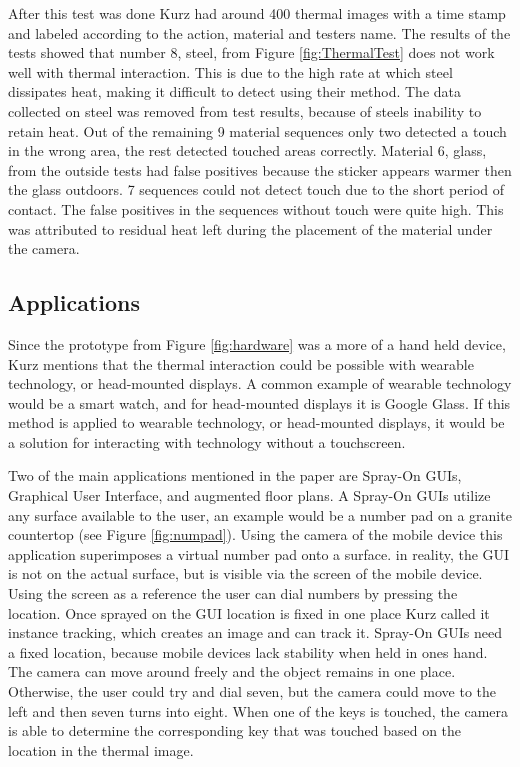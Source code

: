 \documentclass{sig-alternate}
\begin{document}
After this test was done Kurz had around 400 thermal images with a time stamp and labeled according to the action, material and testers name. The results of the tests showed that number 8, steel, from Figure \ref{fig:ThermalTest} does not work well with thermal interaction. This is due to the high rate at which steel dissipates heat, making it difficult to detect using their method. The data collected on steel was removed from test results, because of steels inability to retain heat. Out of the remaining 9 material sequences only two detected a touch in the wrong area, the rest detected touched areas correctly. Material 6, glass, from the outside tests had false positives because the sticker appears warmer then the glass outdoors. 7 sequences could not detect touch due to the short period of contact. The false positives in the sequences without touch were quite high. This was attributed to residual heat left during the placement of the material under the camera.

\subsection{Applications}
\label{Thermal Applications}
Since the prototype from Figure \ref{fig:hardware} was a more of a hand held device, Kurz mentions that the thermal interaction could be possible with wearable technology, or head-mounted displays. A common example of wearable technology would be a smart watch, and for head-mounted displays it is Google Glass. If this method is applied to wearable technology, or head-mounted displays, it would be a solution for interacting with technology without a touchscreen.     

Two of the main applications mentioned in the paper are Spray-On GUIs, Graphical User Interface, and augmented floor plans. A Spray-On GUIs utilize any surface available to the user, an example would be a number pad on a granite countertop (see Figure \ref{fig:numpad}). Using the camera of the mobile device this application superimposes a virtual number pad onto a surface. in reality, the GUI is not on the actual surface, but is visible via the screen of the mobile device. Using the screen as a reference the user can dial numbers by pressing the location. Once sprayed on the GUI location is fixed in one place Kurz called it instance tracking, which creates an image and can track it. Spray-On GUIs need a fixed location, because mobile devices lack stability when held in ones hand. The camera can move around freely and the object remains in one place. Otherwise, the user could try and dial seven, but the camera could move to the left and then seven turns into eight. When one of the keys is touched, the camera is able to determine the corresponding key that was touched based on the location in the thermal image. 
\end{document}
